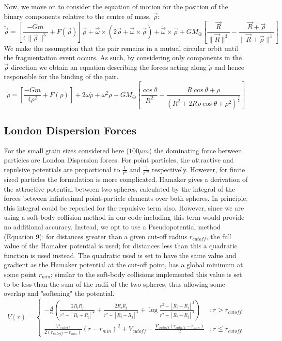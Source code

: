 \documentclass[letterpaper, preprint, paper,11pt]{AAS}	%
\begin{document}
Now, we move on to consider the equation of motion for the position of the binary components relative to the centre of mass, $\vec{\rho}$: 
\begin{equation}
\ddot{\vec{\rho}} = \left[\frac{-Gm}{4\|\vec{\rho}\|^{3}}+F(\vec{\rho})\right]\vec{\rho}+\vec{\omega}\times(2\dot{\vec{\rho}}+\vec{\omega}\times\vec{\rho})+\dot{\vec{\omega}}\times\vec{\rho}+{GM_\oplus}\left[\frac{\vec{R}}{\|\vec{R}\|^{3}}-\frac{\vec{R}+\vec{\rho}}{\|\vec{R}+\vec{\rho}\|^{3}}\right]
\end{equation}
We make the assumption that the pair remains in a mutual circular orbit until the fragmentation event occurs. As such, by considering only components in the $\vec{\rho}$ direction we obtain an equation describing the forces acting along $\ddot{\rho}$ and hence responsible for the binding of the pair.
\begin{equation}\label{eq:rdd}
\ddot{\rho} = \left[\frac{-Gm}{4\rho^{2}}+F(\rho)\right]+2\omega\dot{\rho}+\omega^{2}\rho+{GM_\oplus}\left[\frac{\cos\theta}{R^{2}}-\frac{R\cos\theta+\rho}{(R^{2}+2R\rho\cos\theta+\rho^{2})^\frac{3}{2}}\right]
\end{equation}

 

\subsection{London Dispersion Forces}
For the small grain sizes considered here ($100\mu m$) the dominating force between particles are London Dispersion forces. For point particles, the attractive and repulsive potentials are proportional to $\frac{1}{r^6}$ and $\frac{1}{r^12}$ respectively. However, for finite sized particles the formulation is more complicated. Hamaker gives a derivation of the attractive potential between two spheres, calculated by the integral of the forces between infintesimal point-particle elements over both spheres. In principle, this integral could be repeated for the repulsive term also. However, since we are using a soft-body collision method in our code including this term would provide no additional accuracy. Instead, we opt to use a Pseudopotential method (Equation 9): for distances greater than a given cut-off radius $r_{cutoff}$, the full value of the Hamaker potential is used; for distances less than this a quadratic function is used instead. The quadratic used is set to have the same value and gradient as the Hamaker potential at the cut-off point, has a global minimum at some point $r_{min}$; similar to the soft-body collisions implemented this value is set to be less than the sum of the radii of the two spheres, thus allowing some overlap and "softening" the potential. 
\begin{equation}
V(r) = \left\{
\begin{array}{lr}
-\frac{A}{6}\left(\frac{2R_iR_j}{r^2-[R_i+R_j]^2}+\frac{2R_iR_j}{r^2-[R_i-R_j]^2}+\log\frac{r^2-[R_i+R_j]^2}{r^2-[R_i-R_j]^2}\right) & : r > r_{cutoff}\\
\frac{V'_{cutoff}}{2(r_{cutoff}-r_{min})}(r-r_{min})^2+V_{cutoff} - \frac{V'_{cutoff}(r_{cutoff}-r_{min})}{2} & : r \leq r_{cutoff}
\end{array}
\right.
\end{equation}
\end{document}
